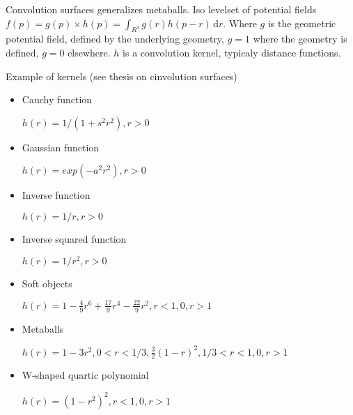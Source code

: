 \documentclass[11pt]{article}
\numberwithin{figure}{section}
\begin{document}
\maketitle


Convolution surfaces generalizes metaballs.
Iso levelset of potential fields $f(p)=g(p)\times h(p)= \int_{R^3} \! g(r)h(p-r) \, \mathrm{d}r. $
Where $g$ is the geometric potential field, defined by the underlying geometry, $g=1$ where the geometry is defined, $g=0$ elsewhere.
$h$ is a convolution kernel, typicaly distance functions.

Example of kernels (see thesis on cinvolution surfaces)

\begin{itemize}

\item{Cauchy function}
\begin{center}
$h(r)=1/(1+s^2r^2), r > 0$
\end{center}

\item{Gaussian function}
\begin{center}
$h(r)=exp(-a^2r^2), r > 0$
\end{center}

\item{Inverse function}
\begin{center}
$h(r)=1/r, r > 0$
\end{center}

\item{Inverse squared function}
\begin{center}
$h(r)=1/r^2, r > 0$
\end{center}

\item{Soft objects}
\begin{center}
$h(r)=1-\frac{4}{9}r^6+\frac{17}{9}r^4-\frac{22}{9}r^2, r < 1, 0, r> 1$
\end{center}

\item{Metaballs}
\begin{center}
$h(r)=1-3r^2, 0 <r < 1/3, \frac{3}{2}(1-r)^2, 1/3< r < 1, 0, r> 1$
\end{center}

\item{W-shaped quartic polynomial}
\begin{center}
$h(r)= (1-r^2)^2,  r < 1, 0, r> 1$
\end{center}

\end{itemize}



 

\end{document}

